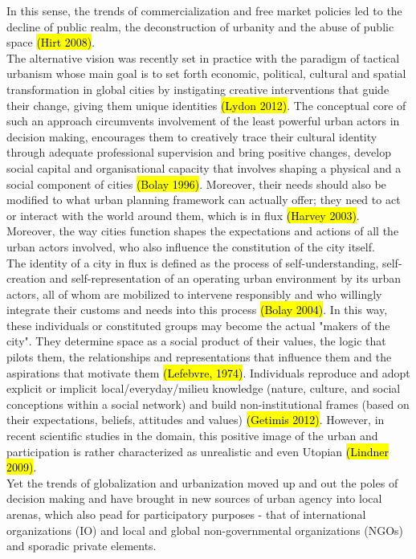 \documentclass[11pt]{report}
\begin{document}
In this sense, the trends of commercialization and free market policies led to the decline of public realm, the deconstruction of urbanity and the abuse of public space \hl{(Hirt 2008)}.
\\
The alternative vision was recently set in practice with the paradigm of tactical urbanism whose main goal is to set forth economic, political, cultural and spatial transformation in global cities by instigating creative interventions that guide their change, giving them unique identities \hl{(Lydon 2012)}.
The conceptual core of such an approach circumvents involvement of the least powerful urban actors in decision making, encourages them to creatively trace their cultural identity through adequate professional supervision and bring positive changes, develop social capital and organisational capacity that involves shaping a physical and a social component of cities \hl{(Bolay 1996)}.
Moreover, their needs should also be modified to what urban planning framework can actually offer; they need to act or interact with the world around them, which is in flux \hl{(Harvey 2003)}.
Moreover, the way cities function shapes the expectations and actions of all the urban actors involved, who also influence the constitution of the city itself.
\\
The identity of a city in flux is defined as the process of self-understanding, self-creation and self-representation of an operating urban environment by its urban actors, all of whom are mobilized to intervene responsibly and who willingly integrate their customs and needs into this process \hl{(Bolay 2004)}. In this way, these individuals or constituted groups may become the actual "makers of the city". They determine space as a social product of their values, the logic that pilots them, the relationships and representations that influence them and the aspirations that motivate them \hl{(Lefebvre, 1974)}.
Individuals reproduce and adopt explicit or implicit local/everyday/milieu knowledge (nature, culture, and social conceptions within a social network) and build non-institutional frames (based on their expectations, beliefs, attitudes and values) \hl{(Getimis 2012)}.
However, in recent scientific studies in the domain, this  positive image of the urban and participation is rather characterized as unrealistic and even Utopian \hl{(Lindner 2009)}.
\\
Yet the trends of globalization and urbanization moved up and out the poles of decision making and have brought in new sources of urban agency into local arenas, which also pead for participatory purposes - that of international organizations (IO) and local and global non-governmental organizations (NGOs) and sporadic private elements.
\end{document}

